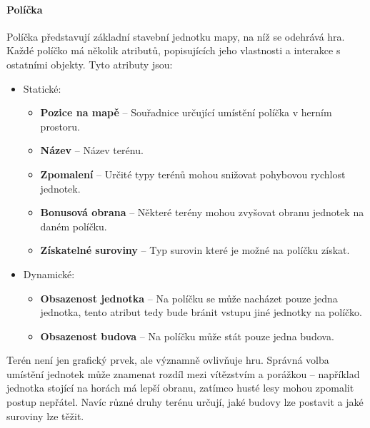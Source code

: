 \paragraph{Políčka}
Políčka představují základní stavební jednotku mapy, na níž se odehrává hra. Každé políčko má několik atributů, popisujících jeho vlastnosti a interakce s ostatními objekty. Tyto atributy jsou:
\begin{itemize}
    \item Statické:
    \begin{itemize}
        \item \textbf{Pozice na mapě} -- Souřadnice určující umístění políčka v herním prostoru.
        \item \textbf{Název} -- Název terénu.
        \item \textbf{Zpomalení} -- Určité typy terénů mohou snižovat pohybovou rychlost jednotek. 
        \item \textbf{Bonusová obrana} -- Některé terény mohou zvyšovat obranu jednotek na daném políčku.
        \item \textbf{Získatelné suroviny} -- Typ surovin které je možné na políčku získat.
    \end{itemize}
    \item Dynamické:
    \begin{itemize}
        \item \textbf{Obsazenost jednotka} -- Na políčku se může nacházet pouze jedna jednotka, tento atribut tedy bude bránit vstupu jiné jednotky na políčko.
    \item \textbf{Obsazenost budova} -- Na políčku může stát pouze jedna budova.
    \end{itemize}
\end{itemize}

Terén není jen grafický prvek, ale významně ovlivňuje hru. Správná volba umístění jednotek může znamenat rozdíl mezi vítězstvím a porážkou – například jednotka stojící na horách má lepší obranu, zatímco husté lesy mohou zpomalit postup nepřátel. Navíc různé druhy terénu určují, jaké budovy lze postavit a jaké suroviny lze těžit.



